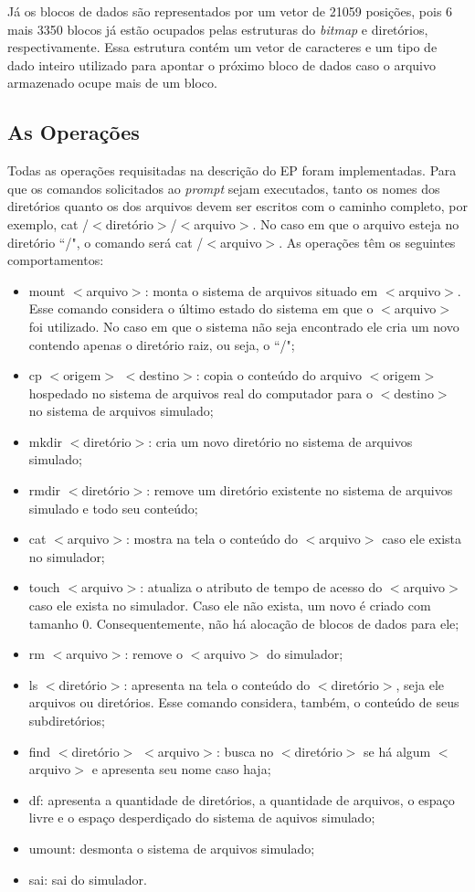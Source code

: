 \documentclass[12pt]{article}
\begin{document}
Já os blocos de dados são representados por um vetor de 21059 posições, pois 6 mais 3350 blocos já estão ocupados pelas estruturas do \textit{bitmap} e diretórios, respectivamente. Essa estrutura contém um vetor de caracteres e um tipo de dado inteiro utilizado para apontar o próximo bloco de dados caso o arquivo armazenado ocupe mais de um bloco.

\subsection{As Operações}

Todas as operações requisitadas na descrição do EP foram implementadas. Para que os comandos solicitados ao \textit{prompt} sejam executados, tanto os nomes dos diretórios quanto os dos arquivos devem ser escritos com o caminho completo, por exemplo, cat /$<$diretório$>$/$<$arquivo$>$. No caso em que o arquivo esteja no diretório ``/", o comando será cat /$<$arquivo$>$. As operações têm os seguintes comportamentos:

\begin{itemize}
	\item mount $<$arquivo$>$: monta o sistema de arquivos situado em $<$arquivo$>$. Esse comando considera o último estado do sistema em que o $<$arquivo$>$ foi utilizado. No caso em que o sistema não seja encontrado ele cria um novo contendo apenas o diretório raiz, ou seja, o ``/";
	\item cp $<$origem$>$ $<$destino$>$: copia o conteúdo do arquivo $<$origem$>$ hospedado no sistema de arquivos real do computador para o $<$destino$>$ no sistema de arquivos simulado;
	\item mkdir $<$diretório$>$: cria um novo diretório no sistema de arquivos simulado;
	\item rmdir $<$diretório$>$: remove um diretório existente no sistema de arquivos simulado e todo seu conteúdo;
	\item cat $<$arquivo$>$: mostra na tela o conteúdo do $<$arquivo$>$ caso ele exista no simulador;
	\item touch $<$arquivo$>$: atualiza o atributo de tempo de acesso do $<$arquivo$>$ caso ele exista no simulador. Caso ele não exista, um novo é criado com tamanho 0. Consequentemente, não há alocação de blocos de dados para ele;
	\item rm $<$arquivo$>$: remove o $<$arquivo$>$ do simulador;
	\item ls $<$diretório$>$: apresenta na tela o conteúdo do $<$diretório$>$, seja ele arquivos ou diretórios. Esse comando considera, também, o conteúdo de seus subdiretórios;
	\item find $<$diretório$>$ $<$arquivo$>$: busca no $<$diretório$>$ se há algum $<$arquivo$>$ e apresenta seu nome caso haja;
	\item df: apresenta a quantidade de diretórios, a quantidade de arquivos, o espaço livre e o espaço desperdiçado do sistema de aquivos simulado;
	\item umount: desmonta o sistema de arquivos simulado;
	\item sai: sai do simulador.
\end{itemize}
\end{document}
